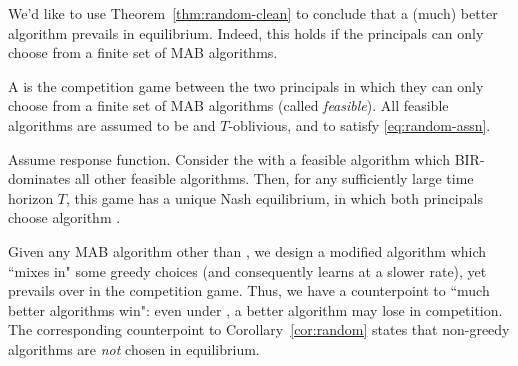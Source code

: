 

We'd like to use Theorem~\ref{thm:random-clean} to conclude that a (much) better algorithm prevails in equilibrium. Indeed, this holds if the principals can only choose from a finite set of MAB algorithms.

\begin{definition}\label{def:restricted-competition}
A \emph{\FiniteGame} is the competition game between the two principals in which they can only choose from a finite set of MAB algorithms (called \emph{feasible}). All feasible algorithms are assumed to be
\bmonotone and $T$-oblivious, and to satisfy \eqref{eq:random-assn}.
\end{definition}

\begin{corollary}\label{cor:random}
Assume \HardMaxRandom response function. Consider the \FiniteGame with a feasible algorithm \alg which BIR-dominates all other feasible algorithms. Then, for any sufficiently large time horizon $T$, this game has a unique Nash equilibrium, in which both principals choose algorithm \alg.
\end{corollary}



Given any \bmonotone MAB algorithm \alg other than \DynGreedy, we design a modified algorithm which ``mixes in" some greedy choices (and consequently learns at a slower rate), yet prevails over \alg in the competition game. Thus, we have a counterpoint to ``much better algorithms win": even under \HardMaxRandom, a better algorithm may lose in competition. The corresponding counterpoint to Corollary~\ref{cor:random} states that non-greedy algorithms are \emph{not} chosen in equilibrium.

